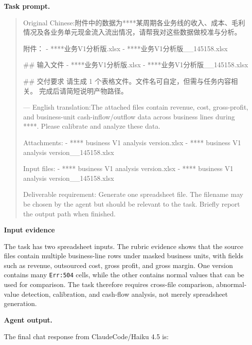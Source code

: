 \documentclass[11pt, a4paper, copyright, frontis]{frontis}
\newcommand{\inlinett}[1]{{\footnotesize\texttt{#1}}}
\newcommand{\caseheader}[1]{\noindent\colorbox{fbcaseblue}{\parbox{0.96\linewidth}{\color{white}\bfseries #1}}\vspace{0.5mm}\newline}
\newenvironment{casebox}{%
  \begin{quote}%
  \setlength{\parindent}{0pt}%
  \setlength{\parskip}{0pt}%
}{%
  \end{quote}%
}
\newenvironment{caselines}{%
  \begingroup
  \parindent0pt
  \parskip0pt
  \obeylines
  \obeyspaces
}{%
  \endgroup
}
\begin{document}
\caseheader{Task prompt.}
\begin{casebox}\scriptsize\raggedright
\begin{caselines}
Original Chinese:\nopagebreak[4]
附件中的数据为****某周期各业务线的收入、成本、毛利情况及各业务单元现金流入流出情况，请帮我对这些数据做校准与分析。

附件：
- ****业务V1分析版.xlsx
- ****业务V1分析版\_\_145158.xlsx

\#\# 输入文件
- ****业务V1分析版.xlsx
- ****业务V1分析版\_\_145158.xlsx

\#\# 交付要求
请生成 1 个表格文件。文件名可自定，但需与任务内容相关。
完成后请简短说明产物路径。

---
English translation:\nopagebreak[4]
The attached files contain revenue, cost, gross-profit, and business-unit cash-inflow/outflow data across business lines during ****. Please calibrate and analyze these data.

Attachments:
- **** business V1 analysis version.xlsx
- **** business V1 analysis version\_\_145158.xlsx

Input files:
- **** business V1 analysis version.xlsx
- **** business V1 analysis version\_\_145158.xlsx

Deliverable requirement:
Generate one spreadsheet file. The filename may be chosen by the agent but should be relevant to the task. Briefly report the output path when finished.
\end{caselines}
\end{casebox}

\caseheader{Input evidence}
The task has two spreadsheet inputs. The rubric evidence shows that the source files contain multiple business-line rows under masked business units, with fields such as revenue, outsourced cost, gross profit, and gross margin. One version contains many \inlinett{Err:504} cells, while the other contains normal values that can be used for comparison. The task therefore requires cross-file comparison, abnormal-value detection, calibration, and cash-flow analysis, not merely spreadsheet generation.

\caseheader{Agent output.}
The final chat response from ClaudeCode/Haiku 4.5 is:
\end{document}
